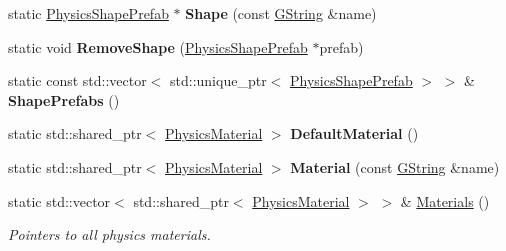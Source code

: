 \begin{DoxyCompactItemize}
\mbox{\label{classrev_1_1_physics_manager_acd6befa8ee9408f3b256d3da2c62c21e}} 
static \mbox{\hyperlink{classrev_1_1_physics_shape_prefab}{Physics\+Shape\+Prefab}} $\ast$ {\bfseries Shape} (const \mbox{\hyperlink{classrev_1_1_g_string}{G\+String}} \&name)
\item 
\mbox{\label{classrev_1_1_physics_manager_a54e0d6d0c05d477c46d8bc09c9f498c4}} 
static void {\bfseries Remove\+Shape} (\mbox{\hyperlink{classrev_1_1_physics_shape_prefab}{Physics\+Shape\+Prefab}} $\ast$prefab)
\item 
\mbox{\label{classrev_1_1_physics_manager_a2e3381f787b34a8ead625afa8941d7e3}} 
static const std\+::vector$<$ std\+::unique\+\_\+ptr$<$ \mbox{\hyperlink{classrev_1_1_physics_shape_prefab}{Physics\+Shape\+Prefab}} $>$ $>$ \& {\bfseries Shape\+Prefabs} ()
\item 
\mbox{\label{classrev_1_1_physics_manager_a0be706332baa5ece6cfb1be1041a6e71}} 
static std\+::shared\+\_\+ptr$<$ \mbox{\hyperlink{classrev_1_1_physics_material}{Physics\+Material}} $>$ {\bfseries Default\+Material} ()
\item 
\mbox{\label{classrev_1_1_physics_manager_a7ad367d7abf5df1fe39efe044c7dd4df}} 
static std\+::shared\+\_\+ptr$<$ \mbox{\hyperlink{classrev_1_1_physics_material}{Physics\+Material}} $>$ {\bfseries Material} (const \mbox{\hyperlink{classrev_1_1_g_string}{G\+String}} \&name)
\item 
\mbox{\label{classrev_1_1_physics_manager_a7bdea4199855b5be1966079f4821bb04}} 
static std\+::vector$<$ std\+::shared\+\_\+ptr$<$ \mbox{\hyperlink{classrev_1_1_physics_material}{Physics\+Material}} $>$ $>$ \& \mbox{\hyperlink{classrev_1_1_physics_manager_a7bdea4199855b5be1966079f4821bb04}{Materials}} ()
\begin{DoxyCompactList}\small\item\em Pointers to all physics materials. \end{DoxyCompactList}\item 
\mbox{\label{classrev_1_1_physics_manager_addd6eb058f6152941391c6e60b11f7c4}} 

\end{DoxyCompactItemize}
